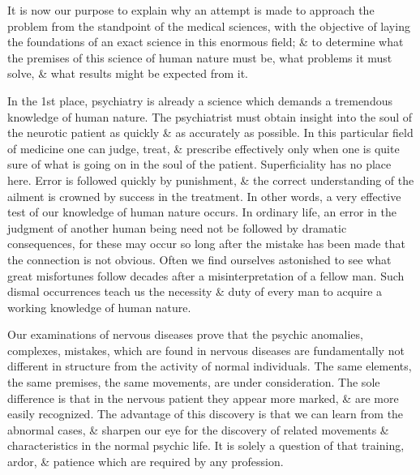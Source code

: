 \documentclass{article}
\begin{document}
It is now our purpose to explain why an attempt is made to approach the problem from the standpoint of the medical sciences, with the objective of laying the foundations of an exact science in this enormous field; \& to determine what the premises of this science of human nature must be, what problems it must solve, \& what results might be expected from it.

In the 1st place, psychiatry is already a science which demands a tremendous knowledge of human nature. The psychiatrist must obtain insight into the soul of the neurotic patient as quickly \& as accurately as possible. In this particular field of medicine one can judge, treat, \& prescribe effectively only when one is quite sure of what is going on in the soul of the patient. Superficiality has no place here. Error is followed quickly by punishment, \& the correct understanding of the ailment is crowned by success in the treatment. In other words, a very effective test of our knowledge of human nature occurs. In ordinary life, an error in the judgment of another human being need not be followed by dramatic consequences, for these may occur so long after the mistake has been made that the connection is not obvious. Often we find ourselves astonished to see what great misfortunes follow decades after a misinterpretation of a fellow man. Such dismal occurrences teach us the necessity \& duty of every man to acquire a working knowledge of human nature.

Our examinations of nervous diseases prove that the psychic anomalies, complexes, mistakes, which are found in nervous diseases are fundamentally not different in structure from the activity of normal individuals. The same elements, the same premises, the same movements, are under consideration. The sole difference is that in the nervous patient they appear more marked, \& are more easily recognized. The advantage of this discovery is that we can learn from the abnormal cases, \& sharpen our eye for the discovery of related movements \& characteristics in the normal psychic life. It is solely a question of that training, ardor, \& patience which are required by any profession.
\end{document}

